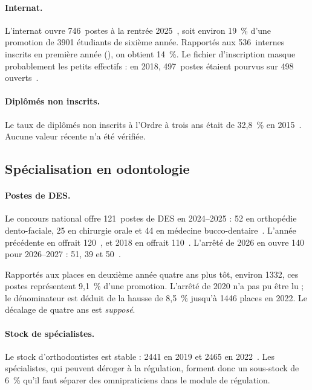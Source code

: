 \paragraph{Internat.}
L'internat ouvre \num{746}~postes à la rentrée 2025~\cite{a1-arrete2024pharma},
soit environ 19~\%\derive{} d'une promotion de \num{3901} étudiants de
sixième année. Rapportés aux \num{536}~internes inscrits en première année
(\mesure), on obtient 14~\%\derive{}. Le fichier d'inscription masque
probablement les petits effectifs : en 2018, 497~postes étaient pourvus sur
498 ouverts~\cite{a1-cng2018}.

\paragraph{Diplômés non inscrits.}
Le taux de diplômés non inscrits à l'Ordre à trois ans était de 32,8~\% en
2015~\cite{a1-cnop2016}. Aucune valeur récente n'a été vérifiée.

\subsection{Spécialisation en odontologie}

\paragraph{Postes de DES.}
Le concours national offre \num{121}~postes de DES en 2024--2025 : \num{52}
en orthopédie dento-faciale, \num{25} en chirurgie orale et \num{44} en
médecine bucco-dentaire~\cite{a1-arrete2024odonto}. L'année précédente en
offrait \num{120}~\cite{a1-arrete2023odonto}, et 2018 en offrait
\num{110}~\cite{a1-cng2018}. L'arrêté de 2026 en ouvre \num{140} pour
2026--2027 : 51, 39 et 50~\cite{a1-arrete2026odonto}.

Rapportés aux places en deuxième année quatre ans plus tôt, environ
\num{1332}\derive{}, ces postes représentent 9,1~\%\derive{} d'une
promotion. L'arrêté de 2020 n'a pas pu être lu ; le dénominateur est déduit
de la hausse de 8,5~\% jusqu'à \num{1446} places en 2022. Le décalage de quatre
ans est \emph{supposé}\suppose{}.

\paragraph{Stock de spécialistes.}
Le stock d'orthodontistes est stable : \num{2441} en 2019 et \num{2465} en
2022~\cite{a1-oncd2022}. Les spécialistes, qui peuvent déroger à la régulation, forment donc
un sous-stock de 6~\%\derive{} qu'il faut séparer des omnipraticiens dans le
module de régulation.

